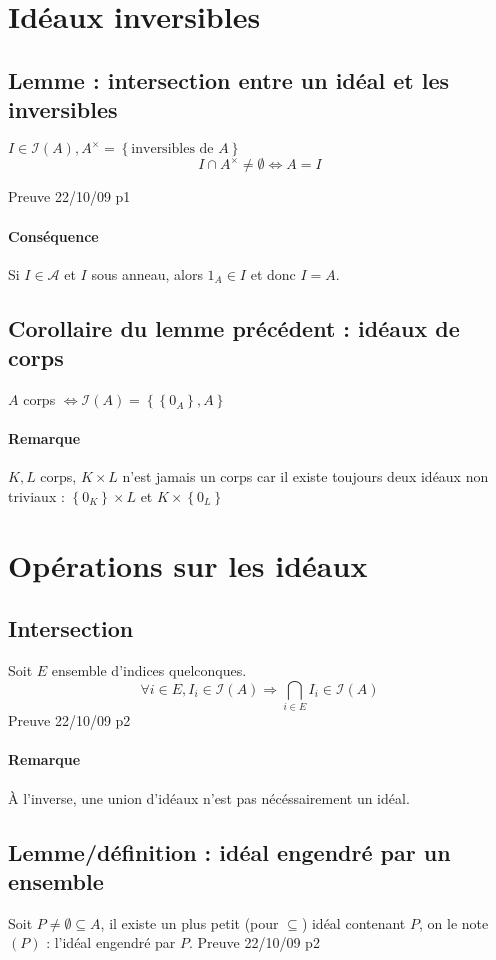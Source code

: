 \documentclass[reqno,a4paper,10pt]{report}
\newcommand{\set}[1]{\left\lbrace #1 \right\rbrace} %
\newcommand{\so}{\Rightarrow}
\begin{document}
\section{Idéaux inversibles}
\subsection{Lemme : intersection entre un idéal et les inversibles}
$I \in \mathcal{I}(A), A^\times = \set{\text{inversibles de } A}$
\[I\cap A^\times \neq \emptyset \iff A=I\]

  Preuve 22/10/09 p1

\paragraph{Conséquence} Si $I\in \mathcal{A}$ et $I$ sous anneau, alors $1_A
\in I$ et donc $I=A$.

\subsection{Corollaire du lemme précédent : idéaux de corps}
$A$ corps $\iff \mathcal{I}(A) = \set{\set{0_A}, A}$

\paragraph{Remarque} $K, L$ corps, $K\times L$ n'est jamais un corps car il
existe toujours deux idéaux non triviaux : $\set{0_K}\times L$ et
$K\times \set{0_L}$

\section{Opérations sur les idéaux}
\subsection{Intersection}
Soit $E$ ensemble d'indices quelconques.
\[\forall i \in E, I_i \in \mathcal{I}(A) \so \bigcap_{i\in E} I_i \in
\mathcal{I}(A)\]
  Preuve 22/10/09 p2

\paragraph{Remarque}
À l'inverse, une union d'idéaux n'est pas nécéssairement un idéal.

\subsection{Lemme/définition : idéal engendré par un ensemble}
Soit $P\neq \emptyset \subseteq A$, il existe un plus petit (pour $\subseteq$)
idéal contenant $P$, on le note $(P)$ : l'idéal engendré par $P$.
  Preuve 22/10/09 p2
\end{document}
